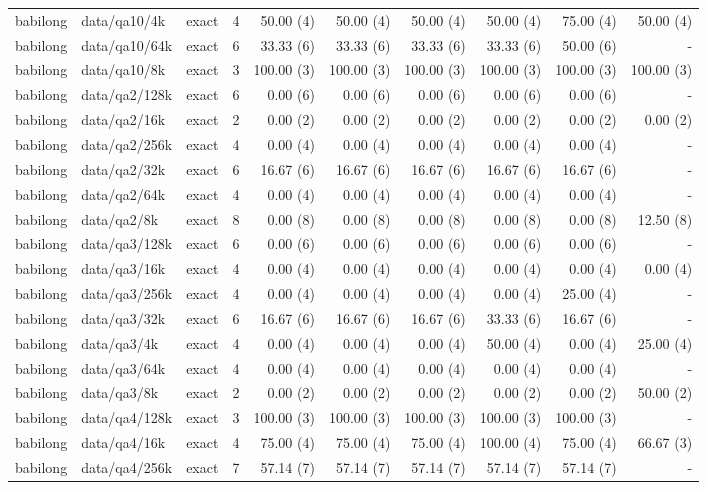 \begin{landscape}
\begin{longtable}{@{}p{19mm}p{52mm}p{25mm}rrrrrrr@{}}
babilong & data/qa10/4k & exact & 4 & 50.00 (4) & 50.00 (4) & 50.00 (4) & 50.00 (4) & 75.00 (4) & 50.00 (4) \\
babilong & data/qa10/64k & exact & 6 & 33.33 (6) & 33.33 (6) & 33.33 (6) & 33.33 (6) & 50.00 (6) & - \\
babilong & data/qa10/8k & exact & 3 & 100.00 (3) & 100.00 (3) & 100.00 (3) & 100.00 (3) & 100.00 (3) & 100.00 (3) \\
babilong & data/qa2/128k & exact & 6 & 0.00 (6) & 0.00 (6) & 0.00 (6) & 0.00 (6) & 0.00 (6) & - \\
babilong & data/qa2/16k & exact & 2 & 0.00 (2) & 0.00 (2) & 0.00 (2) & 0.00 (2) & 0.00 (2) & 0.00 (2) \\
babilong & data/qa2/256k & exact & 4 & 0.00 (4) & 0.00 (4) & 0.00 (4) & 0.00 (4) & 0.00 (4) & - \\
babilong & data/qa2/32k & exact & 6 & 16.67 (6) & 16.67 (6) & 16.67 (6) & 16.67 (6) & 16.67 (6) & - \\
babilong & data/qa2/64k & exact & 4 & 0.00 (4) & 0.00 (4) & 0.00 (4) & 0.00 (4) & 0.00 (4) & - \\
babilong & data/qa2/8k & exact & 8 & 0.00 (8) & 0.00 (8) & 0.00 (8) & 0.00 (8) & 0.00 (8) & 12.50 (8) \\
babilong & data/qa3/128k & exact & 6 & 0.00 (6) & 0.00 (6) & 0.00 (6) & 0.00 (6) & 0.00 (6) & - \\
babilong & data/qa3/16k & exact & 4 & 0.00 (4) & 0.00 (4) & 0.00 (4) & 0.00 (4) & 0.00 (4) & 0.00 (4) \\
babilong & data/qa3/256k & exact & 4 & 0.00 (4) & 0.00 (4) & 0.00 (4) & 0.00 (4) & 25.00 (4) & - \\
babilong & data/qa3/32k & exact & 6 & 16.67 (6) & 16.67 (6) & 16.67 (6) & 33.33 (6) & 16.67 (6) & - \\
babilong & data/qa3/4k & exact & 4 & 0.00 (4) & 0.00 (4) & 0.00 (4) & 50.00 (4) & 0.00 (4) & 25.00 (4) \\
babilong & data/qa3/64k & exact & 4 & 0.00 (4) & 0.00 (4) & 0.00 (4) & 0.00 (4) & 0.00 (4) & - \\
babilong & data/qa3/8k & exact & 2 & 0.00 (2) & 0.00 (2) & 0.00 (2) & 0.00 (2) & 0.00 (2) & 50.00 (2) \\
babilong & data/qa4/128k & exact & 3 & 100.00 (3) & 100.00 (3) & 100.00 (3) & 100.00 (3) & 100.00 (3) & - \\
babilong & data/qa4/16k & exact & 4 & 75.00 (4) & 75.00 (4) & 75.00 (4) & 100.00 (4) & 75.00 (4) & 66.67 (3) \\
babilong & data/qa4/256k & exact & 7 & 57.14 (7) & 57.14 (7) & 57.14 (7) & 57.14 (7) & 57.14 (7) & - \\

\end{longtable}
\end{landscape}
